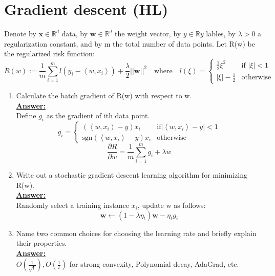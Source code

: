\documentclass{article}
\renewcommand{\vec}[1]{\boldsymbol{#1}}
\newenvironment{qparts}{\begin{enumerate}[1.]}{\end{enumerate}}
\begin{document}
\newpage
\section{Gradient descent (HL)}
Denote by $\vec{x}\in\mathbb{R}^d$ data, by $\vec{w}\in\mathbb{R}^d$ the weight vector, by $y\in\mathbb{R}y$ lables, by $\lambda>0$ a regularization constant, and by m the total number of data points. Let R(w) be the regularized risk function:
\begin{equation}
R(w):=\frac{1}{m}\sum^m_{i=1}l(y_i-\left<w,x_i\right>)+\frac{\lambda}{2}||\vec{w}||^2 \quad\text{where}\quad l(\xi)=\begin{cases}
\frac{1}{2}\xi^2 &\text{if $|\xi|<1$} \\
|\xi|-\frac{1}{2} &\text{otherwise}
\end{cases}
\end{equation}
\begin{qparts}
\item Calculate the batch gradient of R(w) with respect to w.\\
\underline{\textbf{Answer:}}\\
Define $g_i$ as the gradient of ith data point.
\begin{equation}
g_i=\begin{cases}
(\left<w,x_i\right>-y)x_i &\text{if$|\left<w,x_i\right>-y|<1$} \\
\text{sgn}(\left<w,x_i\right>-y)x_i &\text{otherwise}
\end{cases}
\end{equation}
\begin{equation}
\frac{\partial R}{\partial w}=\frac{1}{m}\sum^m_{i=1}g_i+\lambda w
\end{equation}

\item Write out a stochastic gradient descent learning algorithm for minimizing R(w).\\
\underline{\textbf{Answer:}}\\
Randomly select a training instance $x_i$, update w as follows:
\begin{equation}
\vec{w}\leftarrow (1-\lambda\eta_t)\vec{w}-\eta_tg_i
\end{equation}

\item Name two common choices for choosing the learning rate and briefly explain their properties.\\
\underline{\textbf{Answer:}}\\
$O(\frac{1}{\sqrt{t}}), O(\frac{1}{t})$ for strong convexity, Polynomial decay, AdaGrad, etc.
\end{qparts}
\end{document}
